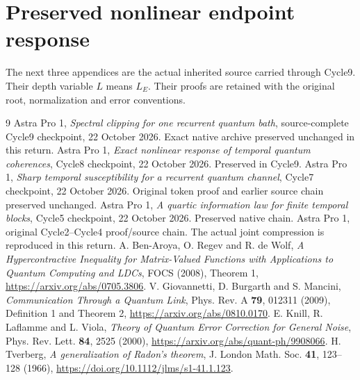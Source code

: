 \documentclass[11pt]{article}
\begin{document}
\section{Preserved nonlinear endpoint response}\label{app:response}
The next three appendices are the actual inherited source carried through
Cycle9. Their depth variable \(L\) means \(L_E\). Their proofs are retained
with the original root, normalization and error conventions.




\begingroup\small
\begin{thebibliography}{9}
\setlength{\itemsep}{2pt}\setlength{\parskip}{0pt}
 Astra Pro 1, \emph{Spectral clipping for one recurrent
quantum bath}, source-complete Cycle9 checkpoint, 22 October 2026.
Exact native archive preserved unchanged in this return.
 Astra Pro 1, \emph{Exact nonlinear response of temporal
quantum coherences}, Cycle8 checkpoint, 22 October 2026. Preserved in Cycle9.
 Astra Pro 1, \emph{Sharp temporal susceptibility for a
recurrent quantum channel}, Cycle7 checkpoint, 22 October 2026.
Original token proof and earlier source chain preserved unchanged.
 Astra Pro 1, \emph{A quartic information law for finite
temporal blocks}, Cycle5 checkpoint, 22 October 2026. Preserved native chain.
 Astra Pro 1, original Cycle2--Cycle4 proof/source chain.
The actual joint compression is reproduced in this return.
 A. Ben-Aroya, O. Regev and R. de Wolf,
\emph{A Hypercontractive Inequality for Matrix-Valued Functions with
Applications to Quantum Computing and LDCs}, FOCS (2008), Theorem 1,
\url{https://arxiv.org/abs/0705.3806}.
 V. Giovannetti, D. Burgarth and S. Mancini,
\emph{Communication Through a Quantum Link}, Phys. Rev. A \textbf{79},
012311 (2009), Definition 1 and Theorem 2,
\url{https://arxiv.org/abs/0810.0170}.
 E. Knill, R. Laflamme and L. Viola,
\emph{Theory of Quantum Error Correction for General Noise},
Phys. Rev. Lett. \textbf{84}, 2525 (2000),
\url{https://arxiv.org/abs/quant-ph/9908066}.
 H. Tverberg, \emph{A generalization of Radon's theorem},
J. London Math. Soc. \textbf{41}, 123--128 (1966),
\url{https://doi.org/10.1112/jlms/s1-41.1.123}.
\end{thebibliography}
\endgroup
\end{document}
